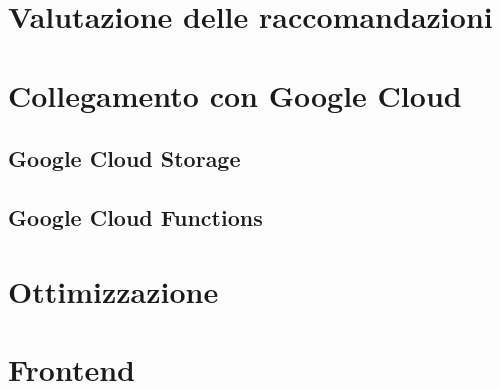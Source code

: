 \section{Valutazione delle raccomandazioni}

\section{Collegamento con Google Cloud}
\subsection{Google Cloud Storage}
\subsection{Google Cloud Functions}

\section{Ottimizzazione}

\section{Frontend}
\label{sec:frontend}
